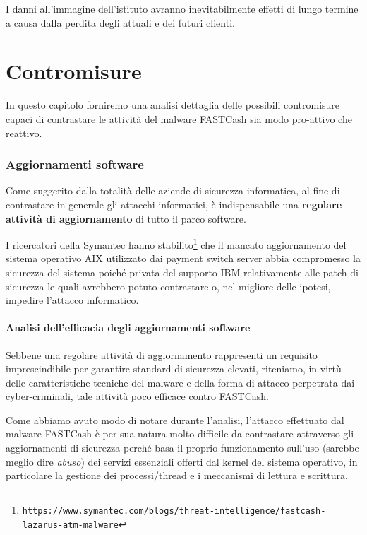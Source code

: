 \documentclass[10pt,a4paper, titlepage]{report}
\begin{document}
I danni all'immagine dell'istituto avranno inevitabilmente effetti di lungo termine a causa dalla perdita degli attuali e dei futuri clienti.

\newpage
\chapter{Contromisure}

In questo capitolo forniremo una analisi dettaglia delle possibili contromisure capaci di contrastare le attività del malware FASTCash sia modo pro-attivo che reattivo.

\subsection{Aggiornamenti software}

Come suggerito dalla totalità delle aziende di sicurezza informatica, al fine di contrastare in generale gli attacchi informatici, è indispensabile una \textbf{regolare attività di aggiornamento} di tutto il parco software.

I ricercatori della Symantec hanno stabilito\footnote{\texttt{https://www.symantec.com/blogs/threat-intelligence/fastcash-lazarus-atm-malware}} che il mancato aggiornamento del sistema operativo AIX utilizzato dai payment switch server abbia compromesso la sicurezza del sistema poiché privata del supporto IBM relativamente alle patch di sicurezza le quali avrebbero potuto contrastare o, nel migliore delle ipotesi, impedire l'attacco informatico. 

\subsubsection{Analisi dell'efficacia degli aggiornamenti software}

Sebbene una regolare attività di aggiornamento rappresenti un requisito imprescindibile per garantire standard di sicurezza elevati, riteniamo, in virtù delle caratteristiche tecniche del malware e della forma di attacco perpetrata dai cyber-criminali, tale attività poco efficace contro FASTCash.
 
Come abbiamo avuto modo di notare durante l'analisi, l'attacco effettuato dal malware FASTCash è per sua natura  molto difficile da contrastare attraverso gli aggiornamenti di sicurezza perché basa il proprio funzionamento sull'uso (sarebbe meglio dire \textit{abuso}) dei servizi essenziali offerti dal kernel del sistema operativo, in particolare la gestione dei processi/thread e i meccanismi di lettura e scrittura. 
\end{document}
